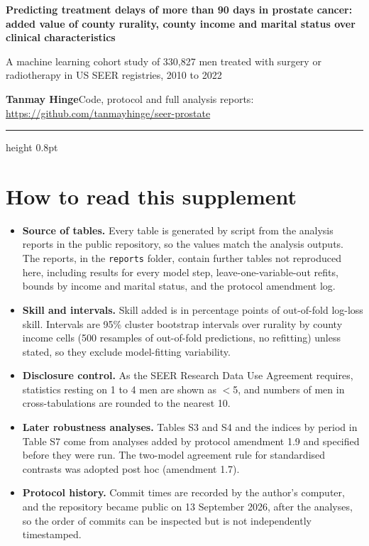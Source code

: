 \documentclass[10pt,a4paper]{article}
\begin{document}
\thispagestyle{firstpage}

\vspace{12pt}
{\raggedright\sffamily\bfseries\fontsize{16}{20}\selectfont Predicting treatment delays of more than 90 days in prostate cancer: added value of county rurality, county income and marital status over clinical characteristics\par}
\vspace{4pt}
{\raggedright\sffamily\large\color{black!70} A machine learning cohort study of 330,827 men treated with surgery or radiotherapy in US SEER registries, 2010 to 2022\par}
\vspace{8pt}
{\raggedright\sffamily\small\textbf{Tanmay Hinge}\enspace\textcolor{black!70}{Code, protocol and full analysis reports: \url{https://github.com/tanmayhinge/seer-prostate}}\par}
\vspace{8pt}
{\color{accent}\hrule height 0.8pt}
\vspace{4pt}

\section{How to read this supplement}
\begin{itemize}
\item \textbf{Source of tables.} Every table is generated by script from the analysis reports in the public repository, so the values match the analysis outputs. The reports, in the \texttt{reports} folder, contain further tables not reproduced here, including results for every model step, leave-one-variable-out refits, bounds by income and marital status, and the protocol amendment log.
\item \textbf{Skill and intervals.} Skill added is in percentage points of out-of-fold log-loss skill. Intervals are 95\% cluster bootstrap intervals over rurality by county income cells (500 resamples of out-of-fold predictions, no refitting) unless stated, so they exclude model-fitting variability.
\item \textbf{Disclosure control.} As the SEER Research Data Use Agreement requires, statistics resting on 1 to 4 men are shown as $<$5, and numbers of men in cross-tabulations are rounded to the nearest 10.
\item \textbf{Later robustness analyses.} Tables S3 and S4 and the indices by period in Table S7 come from analyses added by protocol amendment 1.9 and specified before they were run. The two-model agreement rule for standardised contrasts was adopted post hoc (amendment 1.7).
\item \textbf{Protocol history.} Commit times are recorded by the author's computer, and the repository became public on 13 September 2026, after the analyses, so the order of commits can be inspected but is not independently timestamped.
\end{itemize}
\end{document}
